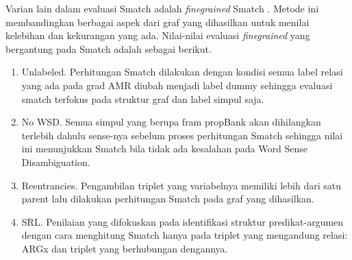 Varian lain dalam evaluasi Smatch adalah \textit{finegrained} Smatch .
Metode ini membandingkan berbagai aspek dari graf yang dihasilkan untuk menilai kelebihan dan kekurangan yang ada.
Nilai-nilai evaluasi \textit{finegrained} yang bergantung pada Smatch adalah sebagai berikut.
\begin{enumerate}
  \item Unlabeled.
  Perhitungan Smatch dilakukan dengan kondisi semua label relasi yang ada pada grad AMR diubah menjadi label dummy sehingga evaluasi smatch terfokus pada struktur graf dan label simpul saja.
  \item No WSD.
  Semua simpul yang berupa fram propBank akan dihilangkan terlebih dahulu sense-nya sebelum proses perhitungan Smatch sehingga nilai ini menunjukkan Smatch bila tidak ada kesalahan pada Word Sense Disambiguation.
  \item Reentrancies.
  Pengambilan triplet yang variabelnya memiliki lebih dari satu parent lalu dilakukan perhitungan Smatch pada graf yang dihasilkan.
  \item SRL.
  Penilaian yang difokuskan pada identifikasi struktur predikat-argumen dengan cara menghitung Smatch hanya pada triplet yang mengandung relasi: ARGx dan triplet yang berhubungan dengannya.
\end{enumerate}
